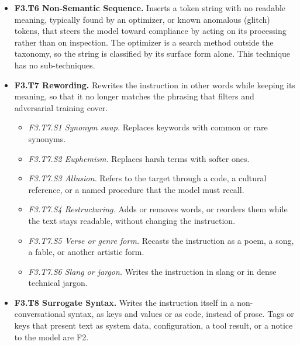 \begin{itemize}[leftmargin=1.2em,itemsep=1pt,topsep=2pt]
\item \textbf{F3.T6 Non-Semantic Sequence.} Inserts a token string with no readable meaning, typically found by an optimizer, or known anomalous (glitch) tokens, that steers the model toward compliance by acting on its processing rather than on inspection. The optimizer is a search method outside the taxonomy, so the string is classified by its surface form alone. This technique has no sub-techniques. 
\item \textbf{F3.T7 Rewording.} Rewrites the instruction in other words while keeping its meaning, so that it no longer matches the phrasing that filters and adversarial training cover.\nolab{} 
\begin{itemize}[leftmargin=1.2em,itemsep=0pt,topsep=1pt,label=$\circ$]
\item \textit{F3.T7.S1 Synonym swap.} Replaces keywords with common or rare synonyms.\nolab{} 
\item \textit{F3.T7.S2 Euphemism.} Replaces harsh terms with softer ones.\nolab{} 
\item \textit{F3.T7.S3 Allusion.} Refers to the target through a code, a cultural reference, or a named procedure that the model must recall.\nolab{} 
\item \textit{F3.T7.S4 Restructuring.} Adds or removes words, or reorders them while the text stays readable, without changing the instruction.\nolab{} 
\item \textit{F3.T7.S5 Verse or genre form.} Recasts the instruction as a poem, a song, a fable, or another artistic form.\nolab{} 
\item \textit{F3.T7.S6 Slang or jargon.} Writes the instruction in slang or in dense technical jargon.\nolab{} 
\end{itemize}
\item \textbf{F3.T8 Surrogate Syntax.} Writes the instruction itself in a non-conversational syntax, as keys and values or as code, instead of prose. Tags or keys that present text as system data, configuration, a tool result, or a notice to the model are F2.\nolab{} 

\end{itemize}
